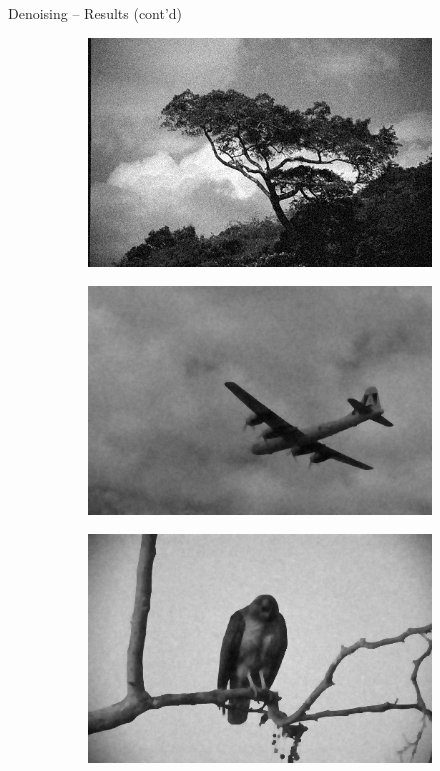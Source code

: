 \documentclass[t]{beamer}
\begin{document}
\begin{frame}{Denoising -- Results (cont'd)}
\begin{figure}[h]
\begin{subfigure}[t]{0.25\textwidth}
			\end{subfigure}
			\begin{subfigure}[t]{0.25\textwidth}
				\includegraphics[scale=0.175]{../paper/pictures/denoising/image/147091_tilde.png}
			\end{subfigure}
			\begin{subfigure}[t]{0.25\textwidth}
				\includegraphics[scale=0.175]{../paper/pictures/denoising/image/3096_ipiano_absolute.png}
			\end{subfigure}
			\begin{subfigure}[t]{0.25\textwidth}
				\includegraphics[scale=0.175]{../paper/pictures/denoising/image/42049_ipiano_absolute.png}

\end{subfigure}
\end{figure}
\end{frame}
\end{document}
